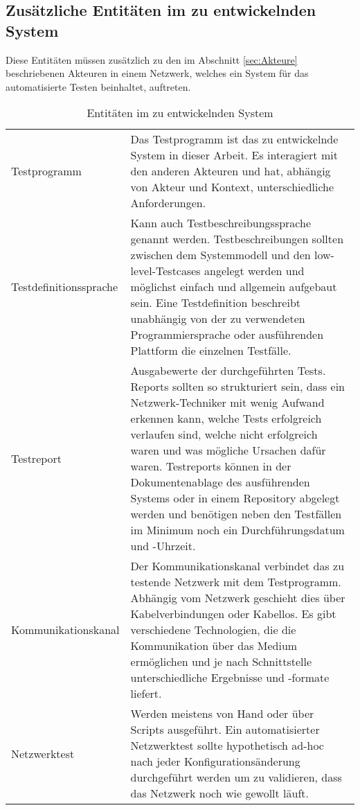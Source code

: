 \documentclass[
	ngerman,
	toc=listof, %
	toc=bibliography, %
	footnotes=multiple, %
	parskip=half, %
	numbers=noendperiod %
]{scrartcl}
\begin{document}
	\newpage

	\subsection{Zusätzliche Entitäten im zu entwickelnden System}
	Diese Entitäten müssen zusätzlich zu den im Abschnitt \ref{sec:Akteure} beschriebenen Akteuren in einem Netzwerk, welches ein System für das automatisierte Testen beinhaltet, auftreten.
	
	\begin{table}[!h]
		\begin{tabularx}{\textwidth}{lX}
			\toprule
			Testprogramm &  Das Testprogramm ist das zu entwickelnde System in dieser Arbeit. Es interagiert mit den anderen Akteuren und hat, abhängig von Akteur und Kontext, unterschiedliche Anforderungen. \\
			Testdefinitionssprache & Kann auch Testbeschreibungssprache genannt werden. Testbeschreibungen sollten zwischen dem Systemmodell und den low-level-Testcases angelegt werden und möglichst einfach und allgemein aufgebaut sein. Eine Testdefinition beschreibt unabhängig von der zu verwendeten Programmiersprache oder ausführenden Plattform die einzelnen Testfälle. \\
			Testreport & Ausgabewerte der durchgeführten Tests. Reports sollten so strukturiert sein, dass ein Netzwerk-Techniker mit wenig Aufwand erkennen kann, welche Tests erfolgreich verlaufen sind, welche nicht erfolgreich waren und was mögliche Ursachen dafür waren. Testreports können in der Dokumentenablage des ausführenden Systems oder in einem Repository abgelegt werden und benötigen neben den Testfällen im Minimum noch ein Durchführungsdatum und -Uhrzeit. \\
			\midrule
			Kommunikationskanal & Der Kommunikationskanal verbindet das zu testende Netzwerk mit dem Testprogramm. Abhängig vom Netzwerk geschieht dies über Kabelverbindungen oder Kabellos. Es gibt verschiedene Technologien, die die Kommunikation über das Medium ermöglichen und je nach Schnittstelle unterschiedliche Ergebnisse und -formate liefert. \\
			Netzwerktest & Werden meistens von Hand oder über Scripts ausgeführt. Ein automatisierter Netzwerktest sollte hypothetisch ad-hoc nach jeder Konfigurationsänderung durchgeführt werden um zu validieren, dass das Netzwerk noch wie gewollt läuft. \\
			\bottomrule
		\end{tabularx}
		\caption{Entitäten im zu entwickelnden System}
	\end{table}
	\newpage
\end{document}
